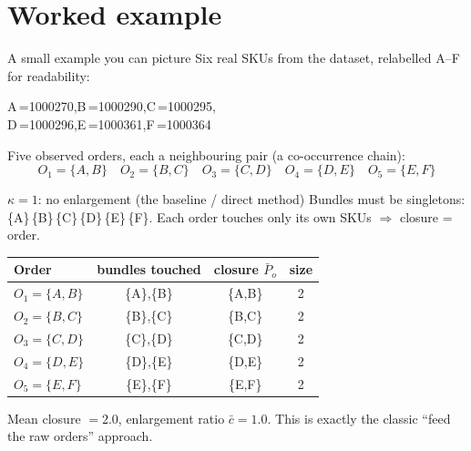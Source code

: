 \documentclass[11pt,aspectratio=169]{beamer}
\newcommand{\kk}{\kappa}
\begin{document}
\section{Worked example}
\begin{frame}{A small example you can picture}
  Six real SKUs from the dataset, relabelled A--F for readability:
  \begin{center}\small
    A\,=1000270,\quad B\,=1000290,\quad C\,=1000295,\\
    D\,=1000296,\quad E\,=1000361,\quad F\,=1000364
  \end{center}
  Five observed orders, each a neighbouring pair (a co-occurrence chain):
  \[
    O_1=\{A,B\}\quad O_2=\{B,C\}\quad O_3=\{C,D\}\quad O_4=\{D,E\}\quad O_5=\{E,F\}
  \]
\end{frame}

\begin{frame}{$\kk=1$: no enlargement (the baseline / direct method)}
  Bundles must be singletons: \{A\}\,\{B\}\,\{C\}\,\{D\}\,\{E\}\,\{F\}.
  Each order touches only its own SKUs $\Rightarrow$ closure = order.
  \begin{center}
  \begin{tabular}{@{}lccc@{}}
    \toprule
    Order & bundles touched & closure $\bar P_o$ & size \\
    \midrule
    $O_1=\{A,B\}$ & \{A\},\{B\} & \{A,B\} & 2 \\
    $O_2=\{B,C\}$ & \{B\},\{C\} & \{B,C\} & 2 \\
    $O_3=\{C,D\}$ & \{C\},\{D\} & \{C,D\} & 2 \\
    $O_4=\{D,E\}$ & \{D\},\{E\} & \{D,E\} & 2 \\
    $O_5=\{E,F\}$ & \{E\},\{F\} & \{E,F\} & 2 \\
    \bottomrule
  \end{tabular}
  \end{center}
  \vspace{0.4em}
  Mean closure $=2.0$, enlargement ratio $\bar c = 1.0$. This is exactly the
  classic ``feed the raw orders'' approach.
\end{frame}
\end{document}
